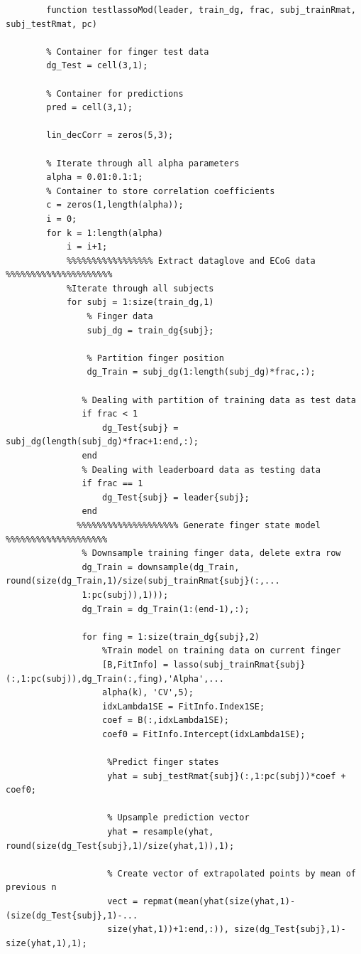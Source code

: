 \documentclass{article}
\begin{document}
	\begin{lstlisting}
		function testlassoMod(leader, train_dg, frac, subj_trainRmat, subj_testRmat, pc)

		% Container for finger test data
		dg_Test = cell(3,1);

		% Container for predictions
		pred = cell(3,1);

		lin_decCorr = zeros(5,3);

		% Iterate through all alpha parameters
		alpha = 0.01:0.1:1;
		% Container to store correlation coefficients
		c = zeros(1,length(alpha));
		i = 0;
		for k = 1:length(alpha)
		    i = i+1;
		    %%%%%%%%%%%%%%%%% Extract dataglove and ECoG data %%%%%%%%%%%%%%%%%%%%%
		    %Iterate through all subjects
		    for subj = 1:size(train_dg,1)
		        % Finger data
		        subj_dg = train_dg{subj};
		        
		        % Partition finger position
		        dg_Train = subj_dg(1:length(subj_dg)*frac,:);
		        
		       % Dealing with partition of training data as test data
		       if frac < 1
		           dg_Test{subj} = subj_dg(length(subj_dg)*frac+1:end,:);
		       end
		       % Dealing with leaderboard data as testing data
		       if frac == 1
		           dg_Test{subj} = leader{subj};
		       end
		      %%%%%%%%%%%%%%%%%%%% Generate finger state model %%%%%%%%%%%%%%%%%%%% 
		       % Downsample training finger data, delete extra row 
		       dg_Train = downsample(dg_Train, round(size(dg_Train,1)/size(subj_trainRmat{subj}(:,...
		       1:pc(subj)),1)));
		       dg_Train = dg_Train(1:(end-1),:);
		       
		       for fing = 1:size(train_dg{subj},2)
		           %Train model on training data on current finger
		           [B,FitInfo] = lasso(subj_trainRmat{subj}(:,1:pc(subj)),dg_Train(:,fing),'Alpha',...
		           alpha(k), 'CV',5);
		           idxLambda1SE = FitInfo.Index1SE;
		           coef = B(:,idxLambda1SE);
		           coef0 = FitInfo.Intercept(idxLambda1SE);
		            
		            %Predict finger states
		            yhat = subj_testRmat{subj}(:,1:pc(subj))*coef + coef0;
		            
		            % Upsample prediction vector
		            yhat = resample(yhat, round(size(dg_Test{subj},1)/size(yhat,1)),1);
		            
		            % Create vector of extrapolated points by mean of previous n
		            vect = repmat(mean(yhat(size(yhat,1)-(size(dg_Test{subj},1)-...
		            size(yhat,1))+1:end,:)), size(dg_Test{subj},1)-size(yhat,1),1);
		            

\end{lstlisting}
\end{document}
